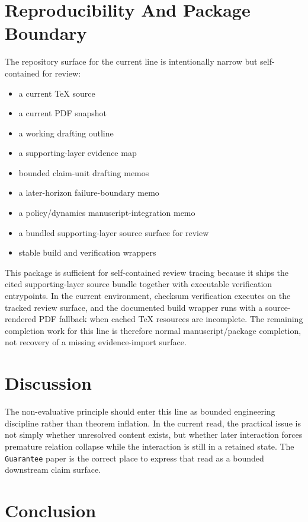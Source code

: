 \documentclass[11pt]{article}
\begin{document}
\section{Reproducibility And Package Boundary}

The repository surface for the current line is intentionally narrow but
self-contained for review:
\begin{itemize}
\item a current TeX source
\item a current PDF snapshot
\item a working drafting outline
\item a supporting-layer evidence map
\item bounded claim-unit drafting memos
\item a later-horizon failure-boundary memo
\item a policy/dynamics manuscript-integration memo
\item a bundled supporting-layer source surface for review
\item stable build and verification wrappers
\end{itemize}

This package is sufficient for self-contained review tracing because it ships
the cited supporting-layer source bundle together with executable verification
entrypoints. In the current environment, checksum verification executes on the
tracked review surface, and the documented build wrapper runs with a
source-rendered PDF fallback when cached TeX resources are incomplete. The
remaining completion work for this line is therefore normal manuscript/package
completion, not recovery of a missing evidence-import surface.

\section{Discussion}

The non-evaluative principle should enter this line as bounded engineering
discipline rather than theorem inflation. In the current read, the practical issue
is not simply whether unresolved content exists, but whether later interaction
forces premature relation collapse while the interaction is still in a retained
state. The \texttt{Guarantee} paper is the correct place to express that read as
a bounded downstream claim surface.

\section{Conclusion}
\end{document}
